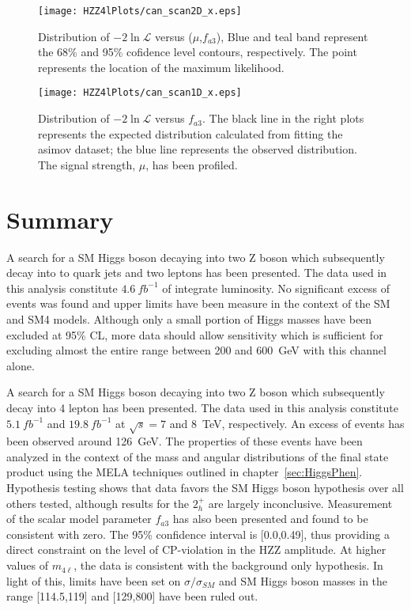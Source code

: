 \begin{figure}
\begin{center}
\texttt{[image: HZZ4lPlots/can\_scan2D\_x.eps]}
\caption{Distribution of $-2\ln\mathscr{L}$ versus ($\mu$,$f_{a3}$),
Blue and teal band represent the 68\% and 95\% cofidence level
contours, respectively.  The point represents the location of the
maximum likelihood.}
\label{fig:HZZ4lfa3Fit2D}
\end{center}
\end{figure}

\begin{figure}
\begin{center}
\texttt{[image: HZZ4lPlots/can\_scan1D\_x.eps]}
\caption{Distribution of $-2\ln\mathscr{L}$ versus $f_{a3}$.
The black line in the right plots 
represents the expected distribution calculated from fitting 
the asimov dataset; the blue line represents the observed 
distribution. The signal strength, $\mu$, has been profiled.}
\label{fig:HZZ4lfa3Fits1D}
\end{center}
\end{figure}


\section{Summary}

A search for a SM Higgs boson decaying into two Z boson which
subsequently decay into to quark jets and two leptons has been 
presented. The data used in this analysis constitute $4.6~fb^{-1}$ 
of integrate luminosity.  No significant excess of events was 
found and upper limits have been measure in the context of the 
SM and SM4 models.  Although only a small portion of Higgs masses 
have been excluded at 95\% CL, more data should allow sensitivity 
which is sufficient for excluding almost the entire range between 
200 and 600~GeV with this channel alone.  

A search for a SM Higgs boson decaying into two Z boson which
subsequently decay into 4 lepton has been presented.  The data
used in this analysis constitute $5.1~fb^{-1}$ and $19.8~fb^{-1}$ 
at $\sqrt{s}=7$ and 8~TeV, respectively.  An excess of events
has been observed around 126~GeV.  The properties of these 
events have been analyzed in the context of the mass and angular
distributions of the final state product using the MELA techniques
outlined in chapter~\ref{sec:HiggsPhen}.  Hypothesis testing 
shows that data favors the SM Higgs boson hypothesis over all 
others tested, although results for the $2_h^+$ are largely
inconclusive.  Measurement of the scalar model parameter $f_{a3}$
has also been presented and found to be consistent with zero.  
The 95\% confidence interval is [0.0,0.49], thus providing a 
direct constraint on the level of CP-violation in the HZZ
amplitude. At higher values of $m_{4\ell}$, the data is consistent
with the background only hypothesis.  In light of this, limits
have been set on $\sigma/\sigma_{SM}$ and SM Higgs boson masses 
in the range [114.5,119] and [129,800] have been ruled out.  

